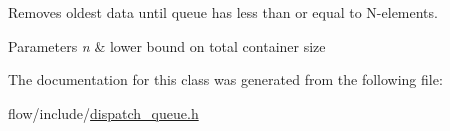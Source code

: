 Removes oldest data until queue has less than or equal to N-\/elements. 


\begin{DoxyParams}{Parameters}
{\em n} & lower bound on total container size \\
\hline
\end{DoxyParams}


The documentation for this class was generated from the following file\+:\begin{DoxyCompactItemize}
\item 
flow/include/\hyperlink{dispatch__queue_8h}{dispatch\+\_\+queue.\+h}\end{DoxyCompactItemize}
